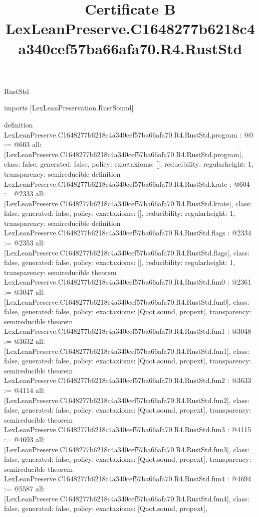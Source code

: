 \begin{lexlean}{RustStd}
\title{Certificate B LexLeanPreserve.C1648277b6218c4a340cef57ba66afa70.R4.RustStd}
\begin{coremodule}
imports [LexLeanPreservation.RustSound]

definition LexLeanPreserve.C1648277b6218c4a340cef57ba66afa70.R4.RustStd.program : @0 := @603 {
  all: [LexLeanPreserve.C1648277b6218c4a340cef57ba66afa70.R4.RustStd.program],
  class: false,
  generated: false,
  policy: exact{axioms: []},
  reducibility: regular{height: 1},
  transparency: semireducible
}
definition LexLeanPreserve.C1648277b6218c4a340cef57ba66afa70.R4.RustStd.krate : @604 := @2333 {
  all: [LexLeanPreserve.C1648277b6218c4a340cef57ba66afa70.R4.RustStd.krate],
  class: false,
  generated: false,
  policy: exact{axioms: []},
  reducibility: regular{height: 1},
  transparency: semireducible
}
definition LexLeanPreserve.C1648277b6218c4a340cef57ba66afa70.R4.RustStd.flags : @2334 := @2353 {
  all: [LexLeanPreserve.C1648277b6218c4a340cef57ba66afa70.R4.RustStd.flags],
  class: false,
  generated: false,
  policy: exact{axioms: []},
  reducibility: regular{height: 1},
  transparency: semireducible
}
theorem LexLeanPreserve.C1648277b6218c4a340cef57ba66afa70.R4.RustStd.fun0 : @2361 := @3047 {
  all: [LexLeanPreserve.C1648277b6218c4a340cef57ba66afa70.R4.RustStd.fun0],
  class: false,
  generated: false,
  policy: exact{axioms: [Quot.sound, propext]},
  transparency: semireducible
}
theorem LexLeanPreserve.C1648277b6218c4a340cef57ba66afa70.R4.RustStd.fun1 : @3048 := @3632 {
  all: [LexLeanPreserve.C1648277b6218c4a340cef57ba66afa70.R4.RustStd.fun1],
  class: false,
  generated: false,
  policy: exact{axioms: [Quot.sound, propext]},
  transparency: semireducible
}
theorem LexLeanPreserve.C1648277b6218c4a340cef57ba66afa70.R4.RustStd.fun2 : @3633 := @4114 {
  all: [LexLeanPreserve.C1648277b6218c4a340cef57ba66afa70.R4.RustStd.fun2],
  class: false,
  generated: false,
  policy: exact{axioms: [Quot.sound, propext]},
  transparency: semireducible
}
theorem LexLeanPreserve.C1648277b6218c4a340cef57ba66afa70.R4.RustStd.fun3 : @4115 := @4693 {
  all: [LexLeanPreserve.C1648277b6218c4a340cef57ba66afa70.R4.RustStd.fun3],
  class: false,
  generated: false,
  policy: exact{axioms: [Quot.sound, propext]},
  transparency: semireducible
}
theorem LexLeanPreserve.C1648277b6218c4a340cef57ba66afa70.R4.RustStd.fun4 : @4694 := @5587 {
  all: [LexLeanPreserve.C1648277b6218c4a340cef57ba66afa70.R4.RustStd.fun4],
  class: false,
  generated: false,
  policy: exact{axioms: [Quot.sound, propext]},
}
\end{coremodule}
\end{lexlean}
